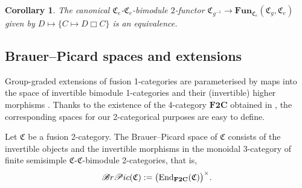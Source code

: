 \documentclass[11pt]{article}
\numberwithin{equation}{section}
\newtheorem{Corollary}[Theorem]{Corollary}
\numberwithin{equation}{section}
\begin{document}
\begin{Corollary}\label{cor:invertibledual}
The canonical $\mathfrak{C}_e$-$\mathfrak{C}_e$-bimodule $2$-functor $\mathfrak{C}_{g^{-1}}\rightarrow \mathbf{Fun}_{\mathfrak{C}_e}(\mathfrak{C}_g,\mathfrak{C}_e)$ given by $D\mapsto \{C\mapsto D\Box C\}$ is an equivalence.
\end{Corollary}

\subsection{Brauer--Picard spaces and extensions}

Group-graded extensions of fusion 1-categories are parameterised by maps into the space of invertible bimodule 1-categories and their (invertible) higher morphisms \cite{ENO2}. Thanks to the existence of the 4-category $\mathbf{F2C}$ obtained in \cite{D10}, the corresponding spaces for our 2-categorical purposes are easy to define.

\begin{Definition}
Let $\mathfrak{C}$ be a fusion 2-category. The Brauer--Picard space of $\mathfrak{C}$ consists of the invertible objects and the invertible morphisms in the monoidal 3-category of finite semisimple $\mathfrak{C}$-$\mathfrak{C}$-bimodule 2-categories, that is, \begin{gather*}\mathscr{B}{\rm r}\mathscr{P}{\rm ic}(\mathfrak{C}):=\big(\mathbf{\operatorname{End}}_{\mathbf{F2C}}(\mathfrak{C})\big)^{\times}.\end{gather*}
\end{Definition}

\end{document}
